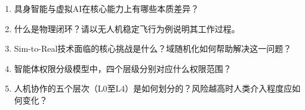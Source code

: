 \begin{enumerate}
\setlength{\itemsep}{6pt}
\item 具身智能与虚拟AI在核心能力上有哪些本质差异？

\item 什么是物理闭环？请以无人机稳定飞行为例说明其工作过程。
\item Sim-to-Real技术面临的核心挑战是什么？域随机化如何帮助解决这一问题？
\item 智能体权限分级模型中，四个层级分别对应什么权限范围？
\item 人机协作的五个层次（L0至L4）是如何划分的？风险越高时人类介入程度应如何变化？
\end{enumerate}










